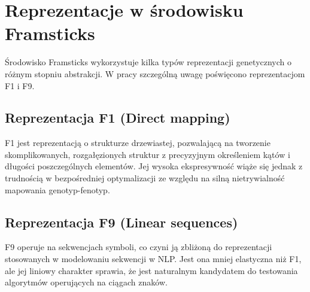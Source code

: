 \section{Reprezentacje w środowisku Framsticks}
Środowisko Framsticks wykorzystuje kilka typów reprezentacji genetycznych o różnym stopniu abstrakcji. W pracy szczególną uwagę poświęcono reprezentacjom F1 i F9.

\subsection{Reprezentacja F1 (Direct mapping)}
F1 jest reprezentacją o strukturze drzewiastej, pozwalającą na tworzenie skomplikowanych, rozgałęzionych struktur z precyzyjnym określeniem kątów i długości poszczególnych elementów. Jej wysoka ekspresywność wiąże się jednak z trudnością w bezpośredniej optymalizacji ze względu na silną nietrywialność mapowania genotyp-fenotyp.

\subsection{Reprezentacja F9 (Linear sequences)}
F9 operuje na sekwencjach symboli, co czyni ją zbliżoną do reprezentacji stosowanych w modelowaniu sekwencji w NLP. Jest ona mniej elastyczna niż F1, ale jej liniowy charakter sprawia, że jest naturalnym kandydatem do testowania algorytmów operujących na ciągach znaków.


